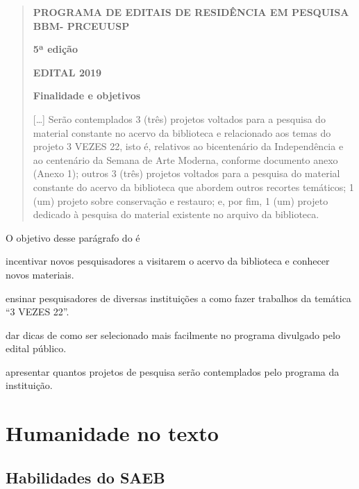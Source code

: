 \begin{quote}
\textbf{PROGRAMA DE EDITAIS DE RESIDÊNCIA EM PESQUISA BBM- PRCEUUSP}

\textbf{5ª edição}

\textbf{EDITAL 2019}

\textbf{Finalidade e objetivos}

{[}\ldots{}{]} Serão contemplados 3 (três) projetos voltados para a
pesquisa do material constante no acervo da biblioteca e relacionado aos
temas do projeto 3 VEZES 22, isto é, relativos ao bicentenário da
Independência e ao centenário da Semana de Arte Moderna, conforme
documento anexo (Anexo 1); outros 3 (três) projetos voltados para a
pesquisa do material constante do acervo da biblioteca que abordem
outros recortes temáticos; 1 (um) projeto sobre conservação e restauro;
e, por fim, 1 (um) projeto dedicado à pesquisa do material existente no
arquivo da biblioteca.

\end{quote}

O objetivo desse parágrafo do é

\begin{escolha}
\item incentivar novos pesquisadores a visitarem o acervo da biblioteca e
conhecer novos materiais.

\item ensinar pesquisadores de diversas instituições a como fazer
trabalhos da temática ``3 VEZES 22''.

\item dar dicas de como ser selecionado mais facilmente no programa
divulgado pelo edital público.

\item apresentar quantos projetos de pesquisa serão contemplados pelo
programa da instituição.
\end{escolha}


\chapter{Humanidade no texto}

\section{Habilidades do SAEB}

